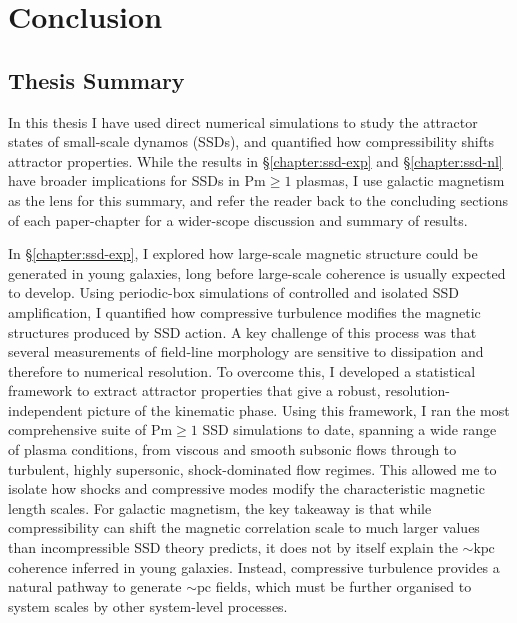 \chapter{Conclusion}

\section{Thesis Summary}

In this thesis I have used direct numerical simulations to study the attractor states of small-scale dynamos (SSDs), and quantified how compressibility shifts attractor properties. While the results in \S\ref{chapter:ssd-exp} and \S\ref{chapter:ssd-nl} have broader implications for SSDs in $\mathrm{Pm} \geq 1$ plasmas, I use galactic magnetism as the lens for this summary, and refer the reader back to the concluding sections of each paper-chapter for a wider-scope discussion and summary of results.

In \S\ref{chapter:ssd-exp}, I explored how large-scale magnetic structure could be generated in young galaxies, long before large-scale coherence is usually expected to develop. Using periodic-box simulations of controlled and isolated SSD amplification, I quantified how compressive turbulence modifies the magnetic structures produced by SSD action. A key challenge of this process was that several measurements of field-line morphology are sensitive to dissipation and therefore to numerical resolution. To overcome this, I developed a statistical framework to extract attractor properties that give a robust, resolution-independent picture of the kinematic phase. Using this framework, I ran the most comprehensive suite of $ \mathrm{Pm} \geq 1 $ SSD simulations to date, spanning a wide range of plasma conditions, from viscous and smooth subsonic flows through to turbulent, highly supersonic, shock-dominated flow regimes. This allowed me to isolate how shocks and compressive modes modify the characteristic magnetic length scales. For galactic magnetism, the key takeaway is that while compressibility can shift the magnetic correlation scale to much larger values than incompressible SSD theory predicts, it does not by itself explain the $\sim \mathrm{kpc}$ coherence inferred in young galaxies. Instead, compressive turbulence provides a natural pathway to generate $\sim \mathrm{pc}$ fields, which must be further organised to system scales by other system-level processes.

